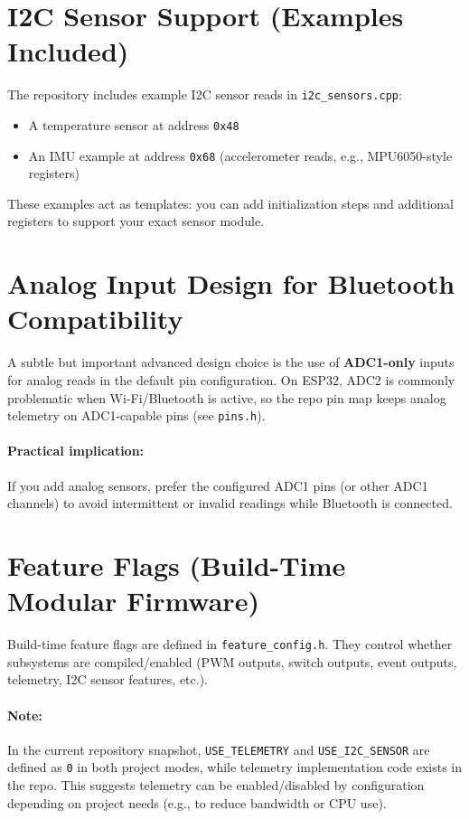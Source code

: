 \section{I2C Sensor Support (Examples Included)}
\label{sec:i2c-sensors}

The repository includes example I2C sensor reads in \texttt{i2c\_sensors.cpp}:

\begin{itemize}
    \item A temperature sensor at address \texttt{0x48}
    \item An IMU example at address \texttt{0x68} (accelerometer reads, e.g., MPU6050-style registers)
\end{itemize}

These examples act as templates: you can add initialization steps and additional registers to support
your exact sensor module.

\section{Analog Input Design for Bluetooth Compatibility}
\label{sec:adc1}

A subtle but important advanced design choice is the use of \textbf{ADC1-only} inputs for analog reads
in the default pin configuration. On ESP32, ADC2 is commonly problematic when Wi-Fi/Bluetooth is active,
so the repo pin map keeps analog telemetry on ADC1-capable pins (see \texttt{pins.h}).

\paragraph{Practical implication:}
If you add analog sensors, prefer the configured ADC1 pins (or other ADC1 channels) to avoid intermittent
or invalid readings while Bluetooth is connected.

\section{Feature Flags (Build-Time Modular Firmware)}
\label{sec:feature-flags}

Build-time feature flags are defined in \texttt{feature\_config.h}. They control whether subsystems
are compiled/enabled (PWM outputs, switch outputs, event outputs, telemetry, I2C sensor features, etc.).

\paragraph{Note:}
In the current repository snapshot, \texttt{USE\_TELEMETRY} and \texttt{USE\_I2C\_SENSOR} are defined as
\texttt{0} in both project modes, while telemetry implementation code exists in the repo. This suggests
telemetry can be enabled/disabled by configuration depending on project needs (e.g., to reduce bandwidth or CPU use).

